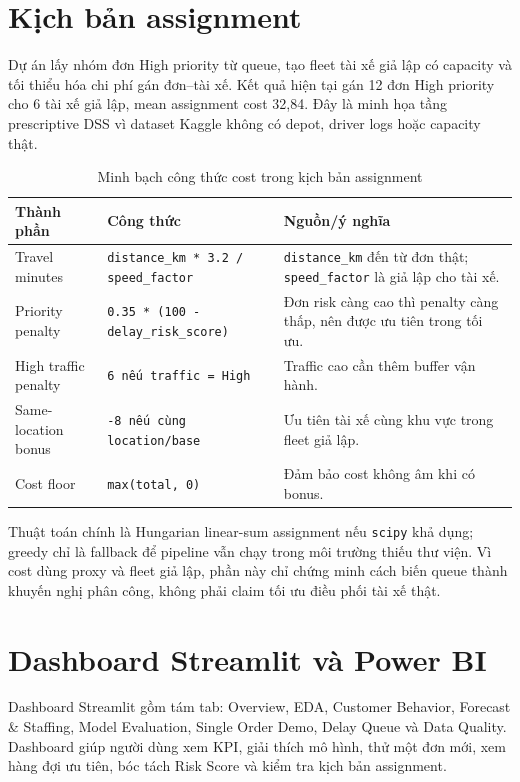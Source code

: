 \documentclass[12pt,a4paper,oneside]{report}
\newcommand{\code}[1]{\nolinkurl{#1}}
\begin{document}
\section{Kịch bản assignment}

Dự án lấy nhóm đơn High priority từ queue, tạo fleet tài xế giả lập có capacity
và tối thiểu hóa chi phí gán đơn--tài xế. Kết quả hiện tại gán 12 đơn High
priority cho 6 tài xế giả lập, mean assignment cost 32,84. Đây là minh họa tầng
prescriptive DSS vì dataset Kaggle không có depot, driver logs hoặc capacity
thật.

\begin{table}[H]
\centering
\small
\caption{Minh bạch công thức cost trong kịch bản assignment}
\begin{tabularx}{\textwidth}{p{3.4cm}p{5.6cm}X}
\toprule
Thành phần & Công thức & Nguồn/ý nghĩa\\
\midrule
Travel minutes & \code{distance\_km * 3.2 / speed\_factor} &
\code{distance\_km} đến từ đơn thật; \code{speed\_factor} là giả lập cho tài xế.\\
Priority penalty & \code{0.35 * (100 - delay\_risk\_score)} &
Đơn risk càng cao thì penalty càng thấp, nên được ưu tiên trong tối ưu.\\
High traffic penalty & \code{6 nếu traffic = High} &
Traffic cao cần thêm buffer vận hành.\\
Same-location bonus & \code{-8 nếu cùng location/base} &
Ưu tiên tài xế cùng khu vực trong fleet giả lập.\\
Cost floor & \code{max(total, 0)} &
Đảm bảo cost không âm khi có bonus.\\
\bottomrule
\end{tabularx}
\end{table}

Thuật toán chính là Hungarian linear-sum assignment nếu \code{scipy} khả dụng;
greedy chỉ là fallback để pipeline vẫn chạy trong môi trường thiếu thư viện.
Vì cost dùng proxy và fleet giả lập, phần này chỉ chứng minh cách biến queue
thành khuyến nghị phân công, không phải claim tối ưu điều phối tài xế thật.

\section{Dashboard Streamlit và Power BI}

Dashboard Streamlit gồm tám tab: Overview, EDA, Customer Behavior, Forecast \&
Staffing, Model Evaluation, Single Order Demo, Delay Queue và Data Quality.
Dashboard giúp người dùng xem KPI, giải thích mô hình, thử một đơn mới, xem
hàng đợi ưu tiên, bóc tách Risk Score và kiểm tra kịch bản assignment.
\end{document}
